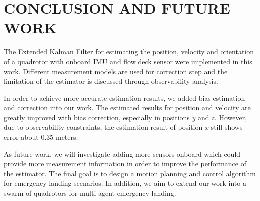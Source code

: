 \documentclass[letterpaper, 10 pt, conference]{ieeeconf}  %
\begin{document}
\section{CONCLUSION AND FUTURE WORK}

The Extended Kalman Filter for estimating the position, velocity and orientation of a quadrotor with onboard IMU and flow deck sensor were implemented in this work. Different measurement models are used for correction step and the limitation of the estimator is discussed through observability analysis. 

In order to achieve more accurate estimation results, we added bias estimation and correction into our work. The estimated results for position and velocity are greatly improved with bias correction, especially in positions $y$ and $z$. However, due to observability constraints, the estimation result of position $x$ still shows error about $0.35$ meters.

As future work, we will investigate adding more sensors onboard which could provide more measurement information in order to improve the performance of the estimator. The final goal is to design a motion planning and control algorithm for emergency landing scenarios. In addition, we aim to extend our work into a swarm of quadrotors for multi-agent emergency landing.      

\addtolength{\textheight}{-12cm}   %



\nocite{*}



\end{document}
